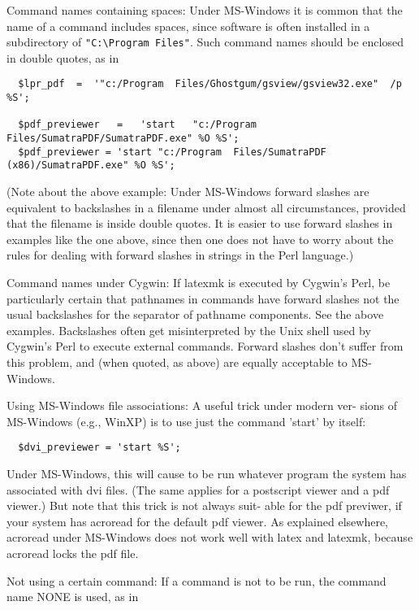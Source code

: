 Command names containing spaces: Under MS-Windows it is common that the
name of a command includes spaces, since software is often installed in a
subdirectory of \verb|"C:\Program Files"|.  Such command names should be
enclosed in double quotes, as in

\begin{verbatim}
  $lpr_pdf  =  '"c:/Program  Files/Ghostgum/gsview/gsview32.exe"  /p %S';
  
  $pdf_previewer   =   'start   "c:/Program   Files/SumatraPDF/SumatraPDF.exe" %O %S';
  $pdf_previewer = 'start "c:/Program  Files/SumatraPDF  (x86)/SumatraPDF.exe" %O %S';
\end{verbatim}


(Note  about  the  above  example: Under MS-Windows forward slashes are
equivalent to backslashes in a filename under almost all circumstances,
provided  that  the  filename is inside double quotes.  It is easier to
use forward slashes in examples like the one above, since then one does
not  have  to worry about the rules for dealing with forward slashes in
strings in the Perl language.)

Command names under Cygwin: If latexmk is executed  by  Cygwin's  Perl,
be particularly certain that pathnames in commands have forward slashes
not the usual backslashes for the  separator  of  pathname  components.
See  the  above  examples.  Backslashes often get misinterpreted by the
Unix shell used by Cygwin's Perl to execute external commands.  Forward
slashes don't suffer from this problem, and (when quoted, as above) are
equally acceptable to MS-Windows.

Using MS-Windows file associations: A useful trick  under  modern  ver-
sions of MS-Windows (e.g., WinXP) is to use just the command 'start' by
itself:

\begin{verbatim}
  $dvi_previewer = 'start %S';
\end{verbatim}

Under MS-Windows, this will cause to be run whatever program the system
has  associated  with  dvi  files.   (The same applies for a postscript
viewer and a pdf viewer.)  But note that this trick is not always suit-
able  for the pdf previwer, if your system has acroread for the default
pdf viewer.  As explained elsewhere, acroread under MS-Windows does not
work well with latex and latexmk, because acroread locks the pdf file.

Not using a certain command: If a command is not to be run, the command
name NONE is used, as in

